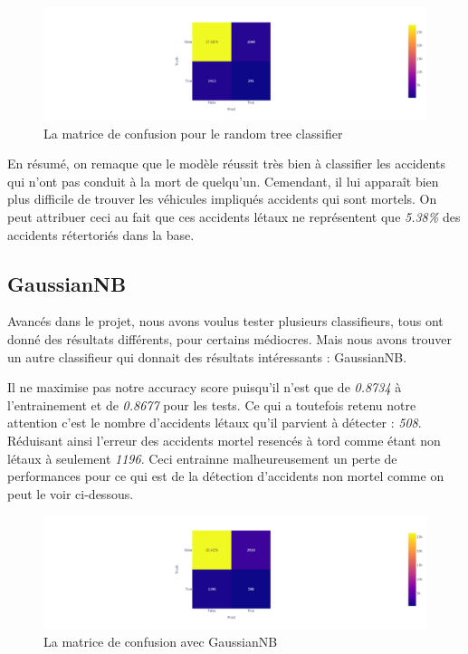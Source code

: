 \documentclass{article}
\begin{document}
    \begin{figure}[h]
        \centering
        \includegraphics[width=\textwidth]{./img/matrice_confusion_tree.png}
        \caption{La matrice de confusion pour le random tree classifier}
    \end{figure}


    En résumé, on remaque que le modèle réussit très bien à classifier les accidents qui n'ont pas conduit à la mort de quelqu'un. Cemendant,
    il lui apparaît bien plus difficile de trouver les véhicules impliqués accidents qui sont mortels. On peut attribuer ceci au fait que
    ces accidents létaux ne représentent que \textit{5.38\%} des accidents rétertoriés dans la base.
    
    \subsection{GaussianNB}
    Avancés dans le projet, nous avons voulus tester plusieurs classifieurs, tous ont donné des résultats différents, pour certains médiocres. 
    Mais nous avons trouver un autre classifieur qui donnait des résultats intéressants : GaussianNB.

    Il ne maximise pas notre accuracy score puisqu'il n'est que de \textit{0.8734} à l'entrainement et de \textit{0.8677} pour les tests. Ce qui
    a toutefois retenu notre attention c'est le nombre d'accidents létaux qu'il parvient à détecter : \textit{508}. Réduisant ainsi l'erreur des
    accidents mortel resencés à tord comme étant non létaux à seulement \textit{1196}. Ceci entrainne malheureusement un perte de performances 
    pour ce qui est de la détection d'accidents non mortel comme on peut le voir ci-dessous.

    \begin{figure}[h]
        \centering
        \includegraphics[width=\textwidth]{./img/matrice_confusion_gaussien.png}
        \caption{La matrice de confusion avec GaussianNB}
    \end{figure}
\end{document}
